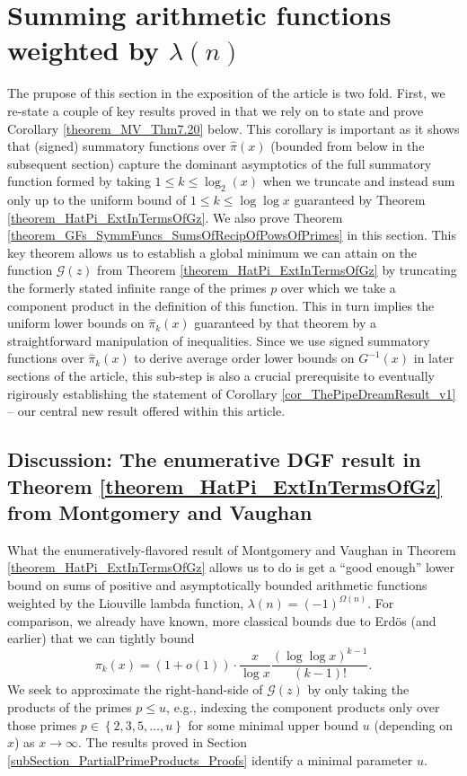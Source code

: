\documentclass[11pt,reqno,a4letter]{article}
\numberwithin{figure}{section}
\numberwithin{table}{section}
\theoremstyle{plain}
\numberwithin{theorem}{section}
\theoremstyle{definition}
\begin{document}
\newpage 
\section{Summing arithmetic functions weighted by $\lambda(n)$} 
\label{Section_MVCh7_GzBounds} 

The prupose of this section in the exposition of the article is two fold. 
First, we re-state a couple of key results proved in \cite[\S 7.4]{MV} that we rely on 
to state and prove Corollary \ref{theorem_MV_Thm7.20} below. This corollary is important as it shows 
that (signed) summatory functions over $\widehat{\pi}(x)$ (bounded from below in the subsequent section) 
capture the dominant asymptotics of the full summatory function formed by taking $1 \leq k \leq \log_2(x)$ when 
we truncate and instead sum only up to the uniform bound of $1 \leq k \leq \log\log x$ guaranteed by 
Theorem \ref{theorem_HatPi_ExtInTermsOfGz}. We also prove 
Theorem \ref{theorem_GFs_SymmFuncs_SumsOfRecipOfPowsOfPrimes} in this section. 
This key theorem allows us to establish a global minimum we can attain on the function $\mathcal{G}(z)$ from 
Theorem \ref{theorem_HatPi_ExtInTermsOfGz} by truncating the formerly stated infinite 
range of the primes $p$ over which we take a component product in the definition of this function. 
This in turn implies the uniform lower bounds on $\widehat{\pi}_k(x)$ guaranteed by that theorem by 
a straightforward manipulation of inequalities. Since we use signed summatory functions over 
$\widehat{\pi}_k(x)$ to derive average order lower bounds on $G^{-1}(x)$ in later sections of the article, 
this sub-step is also a crucial prerequisite to eventually rigirously establishing the statement of 
Corollary \ref{cor_ThePipeDreamResult_v1} -- 
our central new result offered within this article. 

\subsection{Discussion: The enumerative DGF result in Theorem \ref{theorem_HatPi_ExtInTermsOfGz} from 
            Montgomery and Vaughan} 

What the enumeratively-flavored result of Montgomery and Vaughan 
in Theorem \ref{theorem_HatPi_ExtInTermsOfGz} allows us to do is get a 
``good enough'' lower bound on sums of positive and asymptotically bounded arithmetic functions 
weighted by the Liouville lambda function, $\lambda(n) = (-1)^{\Omega(n)}$. 
For comparison, we already have known, more classical bounds due to Erd\"os (and earlier) that 
we can tightly bound \cite{ERDOS-PRIMEK-FUNC,MV} 
\[
\pi_k(x) = (1 + o(1)) \cdot \frac{x}{\log x} \frac{(\log\log x)^{k-1}}{(k-1)!}. 
\] 
We seek to approximate the right-hand-side of $\mathcal{G}(z)$ by only taking the products of the primes 
$p \leq u$, e.g., indexing the component products only over those primes 
$p \in \left\{2,3,5,\ldots,u\right\}$ for some minimal upper bound $u$ (depending on $x$) 
as $x \rightarrow \infty$. 
The results proved in Section \ref{subSection_PartialPrimeProducts_Proofs} identify a minimal parameter $u$. 
\end{document}
